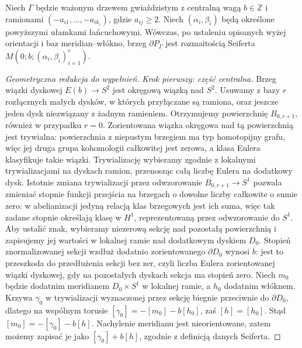 \begin{twierdzenie}
\label{thm:tg-star-seifert}
Niech $\Gamma$ będzie ważonym drzewem
gwiaździstym z centralną wagą $b\in\mathbb Z$ i ramionami
$(-a_{i1},\ldots,-a_{ik_i})$, gdzie $a_{ij}\ge2$.
Niech $(\alpha_i,\beta_i)$ będą określone powyższymi
ułamkami łańcuchowymi. Wówczas, po ustaleniu opisanych
wyżej orientacji i baz meridian--włókno, brzeg
$\partial P_\Gamma$ jest rozmaitością Seiferta
$M(0;b;(\alpha_i,\beta_i)_{i=1}^r)$.
\end{twierdzenie}
\begin{proof}[Geometryczna redukcja do wypełnień]
\emph{Krok pierwszy: część centralna.}
Brzeg wiązki dyskowej $E(b)\to S^2$ jest okręgową
wiązką nad $S^2$. Usuwamy z bazy $r$ rozłącznych małych dysków,
w których przyłączane są ramiona, oraz jeszcze
jeden dysk niezwiązany z żadnym ramieniem.
Otrzymujemy powierzchnię $B_{0,r+1}$, również
w przypadku $r=0$. Zorientowana wiązka okręgowa
nad tą powierzchnią jest trywialna: powierzchnia
z niepustym brzegiem ma typ homotopijny grafu,
więc jej druga grupa kohomologii całkowitej jest
zerowa, a klasa Eulera klasyfikuje takie wiązki.
Trywializację wybieramy zgodnie z lokalnymi
trywializacjami na dyskach ramion, przenosząc
całą liczbę Eulera na dodatkowy dysk.
Istotnie zmiana trywializacji przez odwzorowanie
$B_{0,r+1}\to S^1$ pozwala zmieniać stopnie
funkcji przejścia na brzegach o dowolne liczby
całkowite o sumie zero: w abelianizacji jedyną
relacją klas brzegowych jest ich suma, więc
tak zadane stopnie określają klasę w $H^1$,
reprezentowaną przez odwzorowanie do $S^1$.
Aby ustalić znak, wybieramy niezerową sekcję
nad pozostałą powierzchnią i zapisujemy jej
wartości w lokalnej ramie nad dodatkowym dyskiem
$D_0$. Stopień znormalizowanej sekcji wzdłuż
dodatnio zorientowanego $\partial D_0$ wynosi $b$:
jest to przeszkoda do przedłużenia sekcji bez zer,
czyli liczba Eulera zorientowanej wiązki dyskowej,
gdy na pozostałych dyskach sekcja ma stopień zero.
Niech $m_0$ będzie dodatnim meridianem
$D_0\times S^1$ w lokalnej ramie, a $h_0$
dodatnim włóknem. Krzywa $\gamma_0$ w trywializacji
wyznaczonej przez sekcję biegnie przeciwnie do
$\partial D_0$, dlatego na wspólnym torusie
$[\gamma_0]=-[m_0]-b[h_0]$, zaś $[h]=[h_0]$.
Stąd $[m_0]=-[\gamma_0]-b[h]$.
Nachylenie meridianu jest nieorientowane, zatem
możemy zapisać je jako $[\gamma_0]+b[h]$,
zgodnie z definicją danych Seiferta.


\end{proof}

